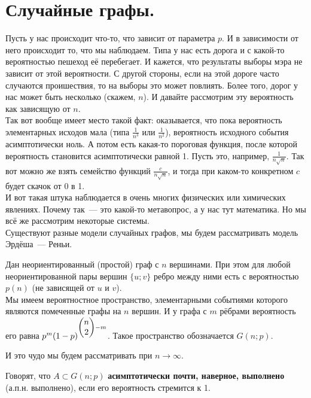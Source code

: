 \documentclass{article}
\begin{document}
    \section{Случайные графы.}
    \begin{remark}
        Пусть у нас происходит что-то, что зависит от параметра $p$. И в зависимости от него происходит то, что мы наблюдаем. Типа у нас есть дорога и с какой-то вероятностью пешеход её перебегает. И кажется, что результаты выборы мэра не зависит от этой вероятности. С другой стороны, если на этой дороге часто случаются проишествия, то на выборы это может повлиять. Более того, дорог у нас может быть несколько (скажем, $n$). И давайте рассмотрим эту вероятность как зависящую от $n$.\\
        Так вот вообще имеет место такой факт: оказывается, что пока вероятность элементарных исходов мала (типа $\frac1{n^3}$ или $\frac1{n^2}$), вероятность исходного события асимптотически ноль. А потом есть какая-то пороговая функция, после которой вероятность становится асимптотически равной 1. Пусть это, например, $\frac1{n\sqrt n}$. Так вот можно же взять семейство функций $\frac c{n\sqrt n}$, и тогда при каком-то конкретном $c$ будет скачок от 0 в 1.\\
        И вот такая штука наблюдается в очень многих физических или химических явлениях. Почему так~--- это какой-то метавопрос, а у нас тут математика. Но мы всё же рассмотрим некоторые системы.\\
        Существуют разные модели случайных графов, мы будем рассматривать модель Эрдёша~--- Реньи.
    \end{remark}
    \begin{definition}
        Дан неориентированный (простой) граф с $n$ вершинами. При этом для любой неориентированной пары вершин $\{u;v\}$ ребро между ними есть с вероятностью $p(n)$ (не зависящей от $u$ и $v$).\\
        Мы имеем вероятностное пространство, элементарными событиями которого являются помеченные графы на $n$ вершин. И у графа с $m$ рёбрами вероятность его равна $p^m(1-p)^{\left(\begin{matrix}n\\2\end{matrix}\right)-m}$. Такое пространство обозначается $G(n;p)$.
    \end{definition}
    \begin{remark}
        И это чудо мы будем рассматривать при $n\to\infty$.
    \end{remark}
    \begin{definition}
        Говорят, что $A\subset G(n;p)$ \textbf{асимптотически почти, наверное, выполнено} (а.п.н. выполнено), если его вероятность стремится к 1.
    \end{definition}
\end{document}
